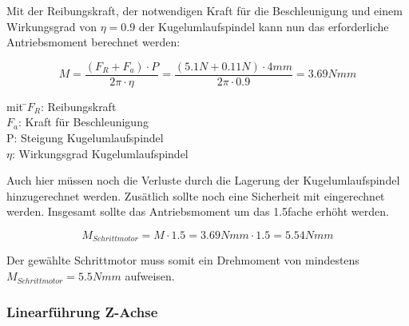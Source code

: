 \documentclass{scrartcl}
\begin{document}
\begin{itemize}
Mit der Reibungskraft, der notwendigen Kraft für die Beschleunigung und einem Wirkungsgrad von $\eta=0.9$ der Kugelumlaufspindel kann nun das erforderliche Antriebsmoment berechnet werden: 

\[M=\dfrac{(F_R + F_a) \cdot P}{2\pi \cdot \eta}=\dfrac{(5.1N+0.11N)\cdot 4mm}{2\pi \cdot 0.9}= 3.69Nmm\]

\begin{tabbing}
mit \=$F_R$: Reibungskraft\\
		\>$F_a$: Kraft für Beschleunigung\\
		\>P: Steigung Kugelumlaufspindel\\
		\>$\eta$: Wirkungsgrad Kugelumlaufspindel\\
		
\end{tabbing}

Auch hier müssen noch die Verluste durch die Lagerung der Kugelumlaufspindel hinzugerechnet werden. Zusätlich sollte noch 
eine Sicherheit mit eingerechnet werden. Insgesamt sollte das Antriebsmoment um das 1.5fache erhöht werden.

\[M_{Schrittmotor}=M \cdot 1.5 = 3.69Nmm \cdot 1.5 = 5.54Nmm\]

		
Der gewählte Schrittmotor muss somit ein Drehmoment von mindestens $M_{Schrittmotor} = 5.5Nmm$ aufweisen.


\end{itemize}


\newpage

\subsubsection{Linearführung Z-Achse}
\end{document}

